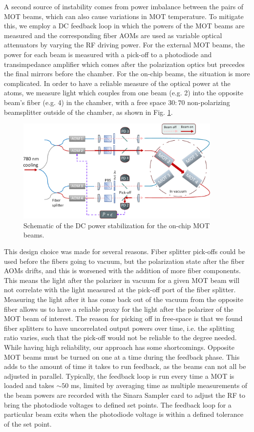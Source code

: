 A second source of instability comes from power imbalance between the pairs of MOT beams, which can also cause variations in MOT temperature. To mitigate this, we employ a DC feedback loop in which the powers of the MOT beams are measured and the corresponding fiber AOMs are used as variable optical attenuators by varying the RF driving power. For the external MOT beams, the power for each beam is measured with a pick-off to a photodiode and transimpedance amplifier\cite{Ebert2017thesis} which comes after the polarization optics but precedes the final mirrors before the chamber. For the on-chip beams, the situation is more complicated. In order to have a reliable measure of the optical power at the atoms, we measure light which couples from one beam (e.g. 2) into the opposite beam's fiber (e.g. 4) in the chamber, with a free space $30:70$ non-polarizing beamsplitter outside of the chamber, as shown in Fig. \ref{fig:mot_feedback}. 
\begin{figure}[!ht]
    \centering
    \includegraphics[width=0.9\textwidth]{Images/on_chip_mot_feedback.pdf}
    \caption{Schematic of the DC power stabilization for the on-chip
    MOT beams.}
    \label{fig:mot_feedback}
\end{figure}
This design choice was made for several reasons. Fiber splitter pick-offs could be used before the fibers going to vacuum, but the polarization state after the fiber AOMs drifts, and this is worsened with the addition of more fiber components. This means the light after the polarizer in vacuum for a given MOT beam will not correlate with the light measured at the pick-off port of the fiber splitter. Measuring the light after it has come back out of the vacuum  from the opposite fiber allows us to have a reliable proxy for the light after the polarizer of the MOT beam of interest. The reason for picking off in free-space is that we found fiber splitters to have uncorrelated output powers over time, i.e. the splitting ratio varies, such that the pick-off would not be reliable to the degree needed. While having high reliability, our approach has some shortcomings. Opposite MOT beams must be turned on one at a time during the feedback phase. This adds to the amount of time it takes to run feedback, as the beams can not all be adjusted in parallel. Typically, the feedback loop is run every time a MOT is loaded and takes $\sim 50$ ms, limited by averaging time as multiple measurements of the beam powers are recorded with the Sinara Sampler card to adjust the RF to bring the photodiode voltages to defined set points. The feedback loop for a particular beam exits when the photodiode voltage is within a defined tolerance of the set point.

